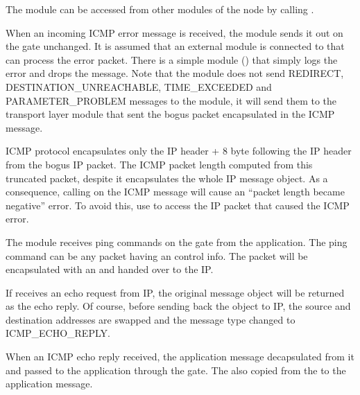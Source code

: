 The  module can be accessed from other modules of the node by calling
.

When an incoming ICMP error message is received, the  module
sends it out on the  gate unchanged. It is assumed that an
external module is connected to  that can process the error
packet. There is a simple module () that simply
logs the error and drops the message. Note that the  module
does not send REDIRECT, DESTINATION\_UNREACHABLE,
TIME\_EXCEEDED and PARAMETER\_PROBLEM messages to the  module,
it will send them to the transport layer module that sent the bogus
packet encapsulated in the ICMP message.
\begin{note}
ICMP protocol encapsulates only the IP header + 8 byte following the IP header
from the bogus IP packet. The ICMP packet length computed from this truncated
packet, despite it encapsulates the whole IP message object.
As a consequence, calling  on the ICMP message
will cause an ``packet length became negative'' error. To avoid this,
use  to access the IP packet that caused the ICMP
error.
\end{note}

The  module receives ping commands on the 
gate from the application. The ping command can be any packet
having an  control info. The packet
will be encapsulated with an  and
handed over to the IP.

If  receives an echo request from IP, the original
message object will be returned as the echo reply. Of course,
before sending back the object to IP, the source and destination
addresses are swapped and the message type changed to ICMP\_ECHO\_REPLY.

When an ICMP echo reply received, the application message decapsulated
from it and passed to the application through the  gate.
The  also copied from the 
to the application message.




